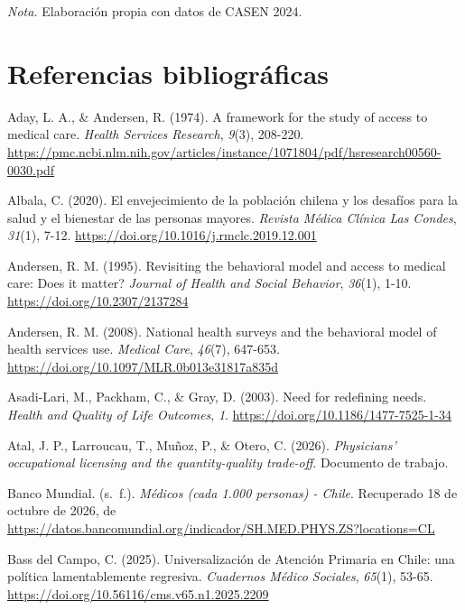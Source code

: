 \documentclass[
  spanish,
  a4paper,
  oneside]{scrbook}
\newlength{\cslhangindent}
\newenvironment{CSLReferences}[2] %
 {\begin{list}{}{%
  \setlength{\itemindent}{0pt}
  \setlength{\leftmargin}{0pt}
  \setlength{\parsep}{0pt}
  \ifodd #1
   \setlength{\leftmargin}{\cslhangindent}
   \setlength{\itemindent}{-1\cslhangindent}
  \fi
  \setlength{\itemsep}{#2\baselineskip}}}
 {\end{list}}
\begin{document}
\emph{Nota.} Elaboración propia con datos de CASEN 2024.


\chapter{Referencias
bibliográficas}\label{referencias-bibliogruxe1ficas}

\protect{}\label{refs}
\begin{CSLReferences}{1}{0}
Aday, L. A., \& Andersen, R. (1974). A framework for the study of access
to medical care. \emph{Health Services Research}, \emph{9}(3), 208-220.
\url{https://pmc.ncbi.nlm.nih.gov/articles/instance/1071804/pdf/hsresearch00560-0030.pdf}

Albala, C. (2020). El envejecimiento de la población chilena y los
desafíos para la salud y el bienestar de las personas mayores.
\emph{Revista Médica Clínica Las Condes}, \emph{31}(1), 7-12.
\url{https://doi.org/10.1016/j.rmclc.2019.12.001}

Andersen, R. M. (1995). Revisiting the behavioral model and access to
medical care: {Does} it matter? \emph{Journal of Health and Social
Behavior}, \emph{36}(1), 1-10. \url{https://doi.org/10.2307/2137284}

Andersen, R. M. (2008). National health surveys and the behavioral model
of health services use. \emph{Medical Care}, \emph{46}(7), 647-653.
\url{https://doi.org/10.1097/MLR.0b013e31817a835d}

Asadi-Lari, M., Packham, C., \& Gray, D. (2003). Need for redefining
needs. \emph{Health and Quality of Life Outcomes}, \emph{1}.
\url{https://doi.org/10.1186/1477-7525-1-34}

Atal, J. P., Larroucau, T., Muñoz, P., \& Otero, C. (2026).
\emph{Physicians' occupational licensing and the quantity-quality
trade-off}. Documento de trabajo.

Banco Mundial. (s.~f.). \emph{Médicos (cada 1.000 personas) - {Chile}}.
Recuperado 18 de octubre de 2026, de
\url{https://datos.bancomundial.org/indicador/SH.MED.PHYS.ZS?locations=CL}

Bass del Campo, C. (2025). Universalización de Atención Primaria en
Chile: una política lamentablemente regresiva. \emph{Cuadernos Médico
Sociales}, \emph{65}(1), 53-65.
\url{https://doi.org/10.56116/cms.v65.n1.2025.2209}


\end{CSLReferences}
\end{document}
